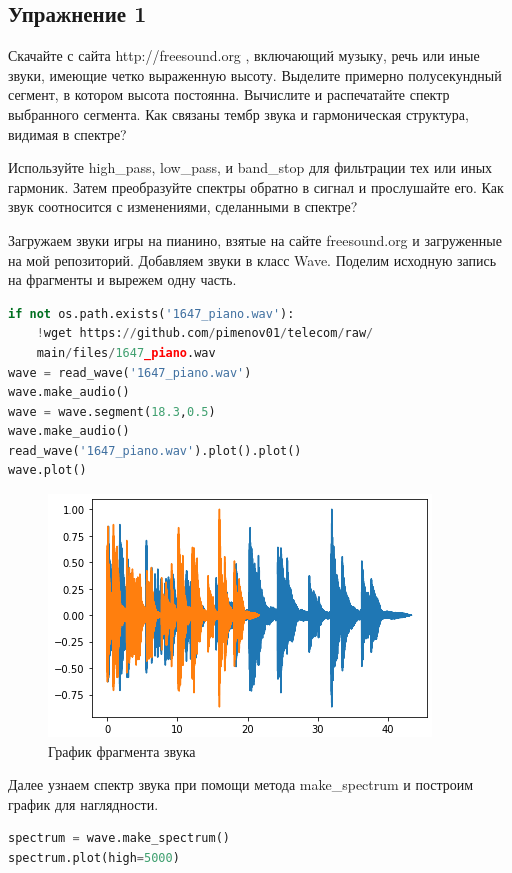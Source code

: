 \subsection{Упражнение 1}

Скачайте с сайта http://freesound.org , включающий музыку, речь или иные звуки, имеющие четко выраженную высоту. Выделите примерно полусекундный сегмент, в котором высота постоянна. Вычислите и распечатайте спектр выбранного сегмента. Как связаны тембр звука и гармоническая структура, видимая в спектре?


\noindent Используйте high\_pass, low\_pass, и band\_stop для фильтрации тех или иных гармоник. Затем преобразуйте спектры обратно в сигнал и прослушайте его. Как звук соотносится с изменениями, сделанными в спектре?
    

Загружаем звуки игры на пианино, взятые на сайте freesound.org и загруженные на мой репозиторий. Добавляем звуки в класс Wave. Поделим исходную запись на фрагменты и вырежем одну часть.

\begin{lstlisting}[language=Python]
if not os.path.exists('1647_piano.wav'):
    !wget https://github.com/pimenov01/telecom/raw/
    main/files/1647_piano.wav
wave = read_wave('1647_piano.wav')
wave.make_audio()
wave = wave.segment(18.3,0.5)
wave.make_audio()
read_wave('1647_piano.wav').plot().plot()
wave.plot()
\end{lstlisting}
    
\begin{figure}[H]
	\begin{center}
		\includegraphics[scale=1]{fig/lab01/lab1_1.png}
		\caption{График фрагмента звука}
	\end{center}
\end{figure}

Далее узнаем спектр звука при помощи метода make\_spectrum и построим график для наглядности.
\begin{lstlisting}[language=Python]
spectrum = wave.make_spectrum()
spectrum.plot(high=5000)
\end{lstlisting}

